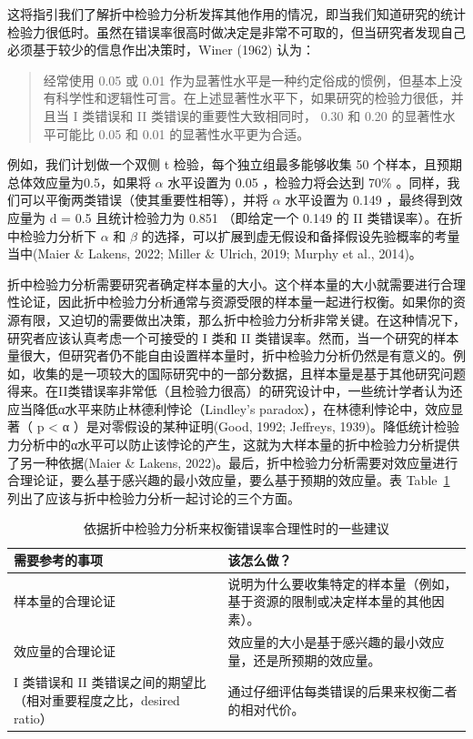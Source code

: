 \documentclass[
  letterpaper,
  DIV=11,
  numbers=noendperiod]{scrreprt}
\begin{document}
这将指引我们了解折中检验力分析发挥其他作用的情况，即当我们知道研究的统计检验力很低时。虽然在错误率很高时做决定是非常不可取的，但当研究者发现自己必须基于较少的信息作出决策时，Winer
(1962) 认为：

\begin{quote}
经常使用 0.05 或 0.01
作为显著性水平是一种约定俗成的惯例，但基本上没有科学性和逻辑性可言。在上述显著性水平下，如果研究的检验力很低，并且当
I 类错误和 II 类错误的重要性大致相同时， 0.30 和 0.20 的显著性水平可能比
0.05 和 0.01 的显著性水平更为合适。
\end{quote}

例如，我们计划做一个双侧 t 检验，每个独立组最多能够收集 50
个样本，且预期总体效应量为0.5，如果将 \(\alpha\) 水平设置为 0.05
，检验力将会达到 70\%
。同样，我们可以平衡两类错误（使其重要性相等），并将 \(\alpha\)
水平设置为 0.149 ，最终得到效应量为 d = 0.5 且统计检验力为 0.851
（即给定一个 0.149 的 II 类错误率）。在折中检验力分析下 \(\alpha\) 和
\(\beta\) 的选择，可以扩展到虚无假设和备择假设先验概率的考量当中(Maier
\& Lakens, 2022; Miller \& Ulrich, 2019; Murphy et al., 2014)。

折中检验力分析需要研究者确定样本量的大小。这个样本量的大小就需要进行合理性论证，因此折中检验力分析通常与资源受限的样本量一起进行权衡。如果你的资源有限，又迫切的需要做出决策，那么折中检验力分析非常关键。在这种情况下，研究者应该认真考虑一个可接受的
I 类和 II
类错误率。然而，当一个研究的样本量很大，但研究者仍不能自由设置样本量时，折中检验力分析仍然是有意义的。例如，收集的是一项较大的国际研究中的一部分数据，且样本量是基于其他研究问题得来。在II类错误率非常低（且检验力很高）的研究设计中，一些统计学者认为还应当降低α水平来防止林德利悖论（Lindley's
paradox），在林德利悖论中，效应显著（ p \textless{} α
）是对零假设的某种证明(Good, 1992; Jeffreys,
1939)。降低统计检验力分析中的α水平可以防止该悖论的产生，这就为大样本量的折中检验力分析提供了另一种依据(Maier
\& Lakens,
2022)。最后，折中检验力分析需要对效应量进行合理论证，要么基于感兴趣的最小效应量，要么基于预期的效应量。表
Table~\ref{tbl-table-compromise-just}
列出了应该与折中检验力分析一起讨论的三个方面。

\hypertarget{tbl-table-compromise-just}{}
\begin{table}
\caption{\label{tbl-table-compromise-just}依据折中检验力分析来权衡错误率合理性时的一些建议 }\tabularnewline

\centering
\begin{tabular}{>{\raggedright\arraybackslash}p{5cm}|>{\raggedright\arraybackslash}p{10cm}}
\hline
需要参考的事项 & 该怎么做？\\
\hline
样本量的合理论证 & 说明为什么要收集特定的样本量（例如，基于资源的限制或决定样本量的其他因素）。\\
\hline
效应量的合理论证 & 效应量的大小是基于感兴趣的最小效应量，还是所预期的效应量。\\
\hline
I 类错误和 II 类错误之间的期望比（相对重要程度之比，desired ratio） & 通过仔细评估每类错误的后果来权衡二者的相对代价。\\
\hline
\end{tabular}
\end{table}
\end{document}
